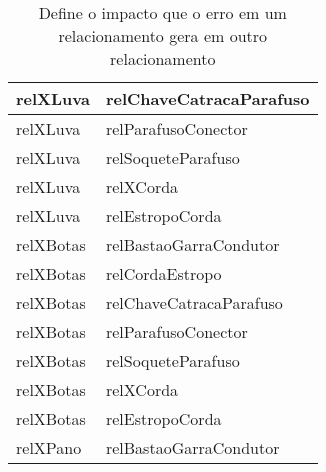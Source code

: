 \begin{table}[H]
\begin{tabular}{|l|l|}
relXLuva                                        & relChaveCatracaParafuso                          \\ \hline
relXLuva                                        & relParafusoConector                              \\ \hline
relXLuva                                        & relSoqueteParafuso                               \\ \hline
relXLuva                                        & relXCorda                                        \\ \hline
relXLuva                                        & relEstropoCorda                                  \\ \hline
relXBotas                                       & relBastaoGarraCondutor                           \\ \hline
relXBotas                                       & relCordaEstropo                                  \\ \hline
relXBotas                                       & relChaveCatracaParafuso                          \\ \hline
relXBotas                                       & relParafusoConector                              \\ \hline
relXBotas                                       & relSoqueteParafuso                               \\ \hline
relXBotas                                       & relXCorda                                        \\ \hline
relXBotas                                       & relEstropoCorda                                  \\ \hline
relXPano                                        & relBastaoGarraCondutor                           \\ \hline
\end{tabular}
\caption{Define o impacto que o erro em um relacionamento gera em outro relacionamento}
\label{relation1}
\end{table}

